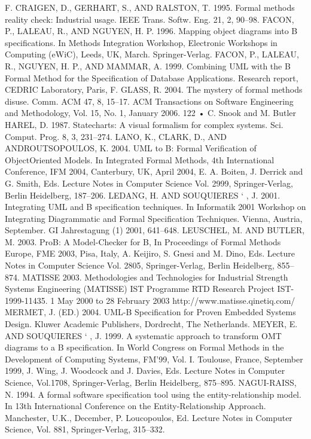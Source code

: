 F.
CRAIGEN, D., GERHART, S., AND RALSTON, T. 1995. Formal methods reality check: Industrial usage.
IEEE Trans. Softw. Eng. 21, 2, 90–98.
FACON, P., LALEAU, R., AND NGUYEN, H. P. 1996. Mapping object diagrams into B specifications. In
Methods Integration Workshop, Electronic Workshops in Computing (eWiC), Leeds, UK, March.
Springer-Verlag.
FACON, P., LALEAU, R., NGUYEN, H. P., AND MAMMAR, A. 1999. Combining UML with the B Formal
Method for the Specification of Database Applications. Research report, CEDRIC Laboratory,
Paris, F.
GLASS, R. 2004. The mystery of formal methods disuse. Comm. ACM 47, 8, 15–17.
ACM Transactions on Software Engineering and Methodology, Vol. 15, No. 1, January 2006.
122 • C. Snook and M. Butler
HAREL, D. 1987. Statecharts: A visual formalism for complex systems. Sci. Comput. Prog. 8, 3,
231–274.
LANO, K., CLARK, D., AND ANDROUTSOPOULOS, K. 2004. UML to B: Formal Verification of ObjectOriented Models. In Integrated Formal Methods, 4th International Conference, IFM 2004, Canterbury, UK, April 2004, E. A. Boiten, J. Derrick and G. Smith, Eds. Lecture Notes in Computer
Science Vol. 2999, Springer-Verlag, Berlin Heidelberg, 187–206.
LEDANG, H. AND SOUQUIERES ` , J. 2001. Integrating UML and B specification techniques. In Informatik 2001 Workshop on Integrating Diagrammatic and Formal Specification Techniques.
Vienna, Austria, September. GI Jahrestagung (1) 2001, 641–648.
LEUSCHEL, M. AND BUTLER, M. 2003. ProB: A Model-Checker for B, In Proceedings of Formal
Methods Europe, FME 2003, Pisa, Italy, A. Keijiro, S. Gnesi and M. Dino, Eds. Lecture Notes in
Computer Science Vol. 2805, Springer-Verlag, Berlin Heidelberg, 855–874.
MATISSE 2003. Methodologies and Technologies for Industrial Strength Systems Engineering
(MATISSE) IST Programme RTD Research Project IST-1999-11435. 1 May 2000 to 28 February
2003 http://www.matisse.qinetiq.com/
MERMET, J. (ED.) 2004. UML-B Specification for Proven Embedded Systems Design. Kluwer Academic Publishers, Dordrecht, The Netherlands.
MEYER, E. AND SOUQUIERES ` , J. 1999. A systematic approach to transform OMT diagrams to a B
specification. In World Congress on Formal Methods in the Development of Computing Systems,
FM’99, Vol. I. Toulouse, France, September 1999, J. Wing, J. Woodcock and J. Davies, Eds. Lecture
Notes in Computer Science, Vol.1708, Springer-Verlag, Berlin Heidelberg, 875–895.
NAGUI-RAISS, N. 1994. A formal software specification tool using the entity-relationship model. In
13th International Conference on the Entity-Relationship Approach. Manchester, U.K., December,
P. Loucopoulos, Ed. Lecture Notes in Computer Science, Vol. 881, Springer-Verlag, 315–332.
